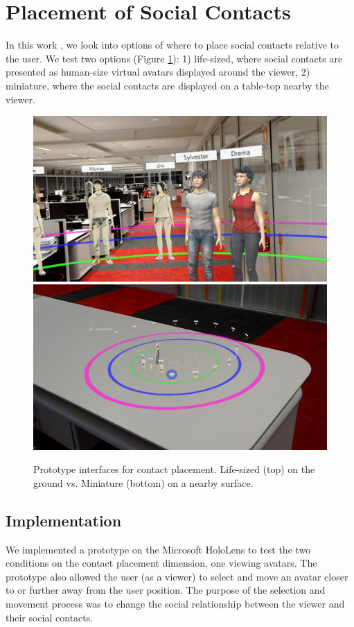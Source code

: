 \section{Placement of Social Contacts}
\label{sec:contacts:placing}

In this work \cite{Nassani2017a}, we look into options of where to place social contacts relative to the user. We test two options (Figure \ref{fig:continuum:conditions}): 1) life-sized, where social contacts are presented as human-size virtual avatars displayed around the viewer, 2) miniature, where the social contacts are displayed on a table-top nearby the viewer. 

\begin{figure}[h]
    \centering
    \includegraphics[width=.6\linewidth]{images/ismar17/20170625_205203_HoloLens.jpg}    \includegraphics[width=.6\linewidth]{images/ismar17/20170625_205112_HoloLens.jpg}
    \caption{Prototype interfaces for contact placement. Life-sized (top) on the ground vs. Miniature (bottom) on a nearby surface.} 
    \label{fig:continuum:conditions}
\end{figure}

\subsection{Implementation}

We implemented a prototype on the Microsoft HoloLens to test the two conditions on the contact placement dimension, one viewing avatars. The prototype also allowed the user (as a viewer) to select and move an avatar closer to or further away from the user position. The purpose of the selection and movement process was to change the social relationship between the viewer and their social contacts. 

